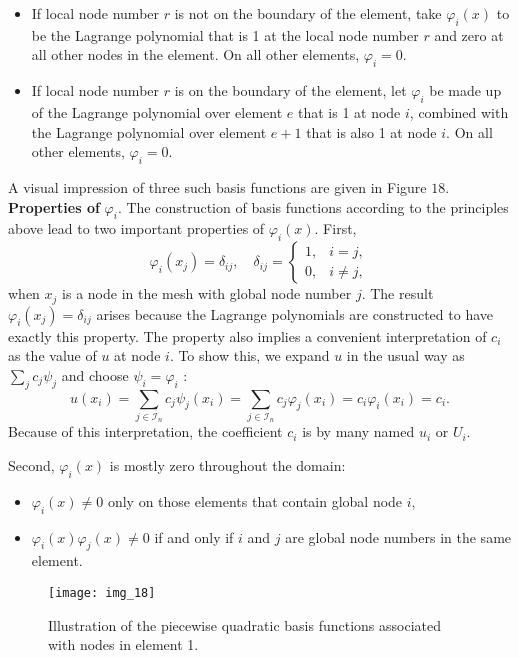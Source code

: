 \documentclass[../main.tex]{subfiles}
\begin{document}
	\begin{itemize}
		\item If local node number $r$ is not on the boundary of the element, take $\varphi_{i}(x)$ to be the Lagrange polynomial that is 1 at the local node number $r$ and zero at all other nodes in the element. On all other elements, $\varphi_{i}=0$.
		\item If local node number $r$ is on the boundary of the element, let $\varphi_{i}$ be made up of the Lagrange polynomial over element $e$ that is 1 at node $i$, combined with the Lagrange polynomial over element $e+1$ that is also 1 at node $i$. On all other elements, $\varphi_{i}=0$.
	\end{itemize}
	A visual impression of three such basis functions are given in Figure $18 .$
	\bigbreak
	\noindent \textbf{Properties of} $\varphi_{i}$. The construction of basis functions according to the principles above lead to two important properties of $\varphi_{i}(x)$. First,
	\begin{equation}\label{eqa52}
		\varphi_{i}\left(x_{j}\right)=\delta_{i j}, \quad \delta_{i j}= \begin{cases}1, & i=j, \\ 0, & i \neq j,\end{cases}
	\end{equation}
	when $x_{j}$ is a node in the mesh with global node number $j$. The result $\varphi_{i}\left(x_{j}\right)=\delta_{i j}$ arises because the Lagrange polynomials are constructed to have exactly this property. The property also implies a convenient interpretation of $c_{i}$ as the value of $u$ at node $i$. To show this, we expand $u$ in the usual way as $\sum_{j} c_{j} \psi_{j}$ and choose $\psi_{i}=\varphi_{i}$ :
	$$
	u\left(x_{i}\right)=\sum_{j \in \mathcal{I}_{n}} c_{j} \psi_{j}\left(x_{i}\right)=\sum_{j \in \mathcal{I}_{n}} c_{j} \varphi_{j}\left(x_{i}\right)=c_{i} \varphi_{i}\left(x_{i}\right)=c_{i}.
	$$
	Because of this interpretation, the coefficient $c_{i}$ is by many named $u_{i}$ or $U_{i}$.
	
	Second, $\varphi_{i}(x)$ is mostly zero throughout the domain:
	\begin{itemize}
		\item $\varphi_{i}(x) \neq 0$ only on those elements that contain global node $i$,
		\item $\varphi_{i}(x) \varphi_{j}(x) \neq 0$ if and only if $i$ and $j$ are global node numbers in the same element.
	\end{itemize}
	\begin{figure}[H]
		\centering
		\texttt{[image: img\_18]}
		\caption{Illustration of the piecewise quadratic basis functions associated
			with nodes in element 1.}
		\label{fig:img_18}
	\end{figure}
	
\end{document}
